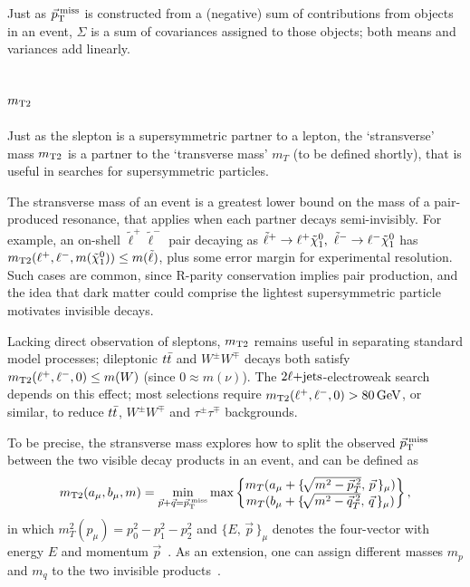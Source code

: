 Just as $\ptmiss$ is constructed from a (negative) sum of contributions from
objects in an event,
$\Sigma$ is a sum of covariances assigned to those objects;
both means and variances add linearly.


\subsection{\texorpdfstring{$\mttwo$}{mT2}}
\label{sec:2ljets_mt2}
Just as the slepton is a supersymmetric partner to a lepton, the `stransverse'
mass $\mttwo$ is a partner to the `transverse mass' $m_T$
(to be defined shortly),
that is useful in searches for supersymmetric particles.

The stransverse mass of an event is a greatest lower bound on the mass of a
pair-produced resonance, that applies when each partner decays semi-invisibly.
For example, an on-shell $\tilde\ell^+\tilde\ell^-$ pair decaying as
$\tilde\ell^+ \rightarrow \ell^+ \neutralino_1
,~
\tilde\ell^- \rightarrow \ell^- \neutralino_1$ has
$\mttwo(\ell^+, \ell^-, m(\neutralino_1)) \leq m(\tilde\ell)$, plus some error
margin for experimental resolution.
Such cases are common, since R-parity conservation implies pair production,
and the idea that dark matter could comprise the lightest supersymmetric
particle motivates invisible decays.

Lacking direct observation of sleptons, $\mttwo$ remains useful in separating
standard model processes; dileptonic $\ttbar$ and $W^\pm W^\mp$ decays both
satisfy $\mttwo(\ell^+, \ell^-, 0) \leq m(W)$ (since $0 \approx m(\nu)$).
The $\twoljets$-electroweak search depends on this effect;
most selections require $\mttwo(\ell^+, \ell^-, 0) > 80\,\eV[G]$, or similar,
to reduce $\ttbar$, $W^\pm W^\mp$ and $\tau^\pm\tau^\mp$ backgrounds.

To be precise, the stransverse mass explores how to split the observed
$\ptmiss$ between the two visible decay products in an event, and can be
defined as
\begin{equation}
\mttwo(a_\mu, b_\mu, m)
=
\min_{\vec p + \vec q=\ptmiss}
\max
\begin{Bmatrix}
m_T(a_\mu + \{\!\sqrt{m^2 - \vec p_T^{\:2}},\,\vec p\,\}_\mu)\\
m_T(b_\mu + \{\!\sqrt{m^2 - \vec q_T^{\:2}},\,\vec q\,\}_\mu)\\
\end{Bmatrix}
,
\end{equation}
in which $m_T^2(p_\mu) = p_0^2 - p_1^2 - p_2^2$ and $\{E,\,\vec p\,\}_\mu$ denotes
the four-vector with energy $E$ and momentum $\vec p$~\cite{lester1999measuring}.
As an extension, one can assign different masses $m_p$ and $m_q$ to
the two invisible products~\cite{lester2015bisection}.


